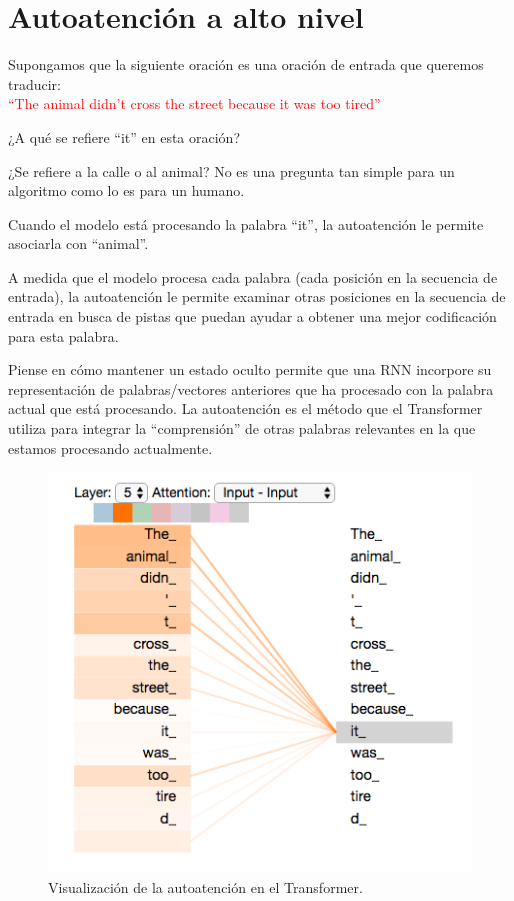 \section{Autoatención a alto nivel}

Supongamos que la siguiente oración es una oración de entrada que queremos traducir:
\\ \textcolor{red}{``The animal didn't cross the street because it was too tired''}

¿A qué se refiere ``it'' en esta oración?

¿Se refiere a la calle o al animal? No es una pregunta tan simple para un algoritmo como lo es para un humano.

Cuando el modelo está procesando la palabra ``it'', la autoatención le permite asociarla con ``animal''.

A medida que el modelo procesa cada palabra (cada posición en la secuencia de entrada), la autoatención le permite examinar otras posiciones en la secuencia de entrada en busca de pistas que puedan ayudar a obtener una mejor codificación para esta palabra.

Piense en cómo mantener un estado oculto permite que una RNN incorpore su representación de palabras/vectores anteriores que ha procesado con la palabra actual que está procesando. La autoatención es el método que el Transformer utiliza para integrar la ``comprensión'' de otras palabras relevantes en la que estamos procesando actualmente.

\begin{figure}[h]
  \centering
  \includegraphics[scale=0.35]{pics/transformer_self-attention_visualization.png}
  \caption{Visualización de la autoatención en el Transformer.}
\end{figure}

